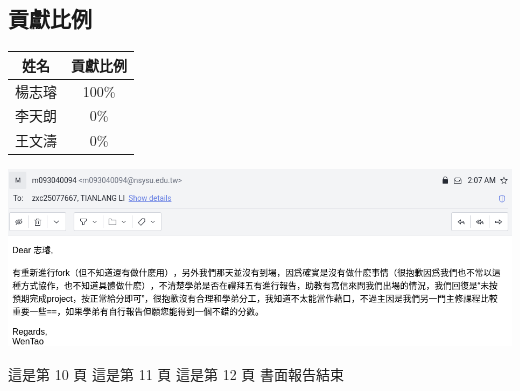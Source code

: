 \documentclass[a4paper]{article}
\begin{document}
\begin{CJK*}{UTF8}{bsmi}
    \subsection{貢獻比例}
    \begin{center}
        \begin{tabular}{||c c||}
            \hline
            姓名   & 貢獻比例 \\ [0.5ex]
            \hline\hline
            楊志璿 & 100\%    \\
            \hline
            李天朗 & 0\%      \\
            \hline
            王文濤 & 0\%      \\
            \hline
        \end{tabular}
    \end{center}
    \includegraphics[width=\textwidth]{images/Screenshot_2022-01-18_15-09-06.png}
    \newpage

    這是第 10 頁
    \newpage
    這是第 11 頁
    \newpage
    這是第 12 頁
    \newpage
    書面報告結束
    \newpage

\end{CJK*}
\end{document}
